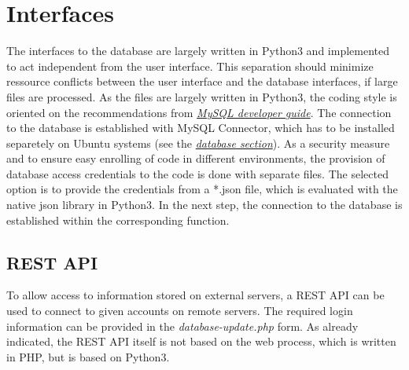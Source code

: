 
\chapter{Interfaces}
The interfaces to the database are largely written in Python3 and implemented to act independent from the user interface. This separation should minimize ressource conflicts between the user 
interface and the database interfaces, if large files are processed. As the files are largely written in Python3, the coding style is oriented on the recommendations from 
\href{https://dev.mysql.com/doc/connector-python/en/}{\textit{MySQL developer guide}}. The connection to the database is established with MySQL Connector, which has to be installed separetely on Ubuntu 
systems (see the \hyperref[Database installation and configuration]{\textit{database section}}). 
As a security measure and to ensure easy enrolling of code in different environments, the provision of database access credentials to the code is done with separate files. The selected option is to 
provide the credentials from a *.json file, which is evaluated with the native json library in Python3. In the next step, the connection to the database is established within the corresponding 
function.\\

\section{REST API}
To allow access to information stored on external servers, a REST API can be used to connect to given accounts on remote servers. The required login information can be provided in the \emph{database-update.php} form. As already indicated, the REST API itself is not based on the web process, which is written in PHP, but is based on Python3. 